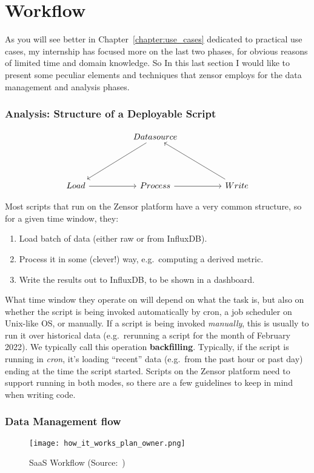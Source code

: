 \section{Workflow}
As you will see better in Chapter~\ref{chapter:use_cases} dedicated to practical use cases, my internship has focused more on the last two phases, for obvious reasons of limited time and domain knowledge.
So In this last section I would like to present some peculiar elements and techniques that zensor employs for the data management and analysis phases.


\subsubsection{Analysis: Structure of a Deployable Script}\label{subsection:script_structure}
\[\begin{tikzcd}
		&& Datasource \\
		&& {} \\
		Load && Process && Write
		\arrow[from=3-1, to=3-3]
		\arrow[from=3-3, to=3-5]
		\arrow[from=1-3, to=3-1]
		\arrow[from=3-5, to=1-3]
	\end{tikzcd}\]

Most scripts that run on the Zensor platform have a very common structure, so for a given time window, they:
\begin{enumerate}
	\item Load batch of data (either raw or from InfluxDB).
	\item Process it in some (clever!) way, e.g.\ computing a derived metric.
	\item Write the results out to InfluxDB, to be shown in a dashboard.
\end{enumerate}
What time window they operate on will depend on what the task is, but also on whether the script is being invoked automatically by cron, a job scheduler on Unix-like OS, or manually.
If a script is being invoked \textit{manually}, this is usually to run it over historical data (e.g.\ rerunning a script for the month of February 2022). We typically call this operation \textbf{backfilling}.
Typically, if the script is running in \textit{cron}, it's loading ``recent'' data (e.g.\ from the past hour or past day) ending at the time the script started.
Scripts on the Zensor platform need to support running in both modes, so there are a few guidelines to keep in mind when writing code.

\subsubsection{Data Management flow}
\begin{figure}[ht]
    \centering
    \texttt{[image: how\_it\_works\_plan\_owner.png]}
    \caption{\acl{SaaS} Workflow (Source:~\cite{Misc:zensor_official_website})}
    \label{fig:zensor_flow}
\end{figure}